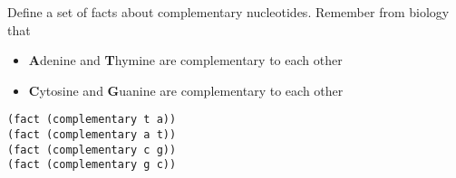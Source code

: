 \question
Define a set of facts about complementary nucleotides. Remember from biology that
\begin{itemize}
\item \textbf{A}denine and \textbf{T}hymine are complementary to each other
\item \textbf{C}ytosine and \textbf{G}uanine are complementary to each other
\end{itemize}

\begin{solution}[1in]
\begin{lstlisting}
(fact (complementary t a))
(fact (complementary a t))
(fact (complementary c g))
(fact (complementary g c))
\end{lstlisting}
\end{solution}

